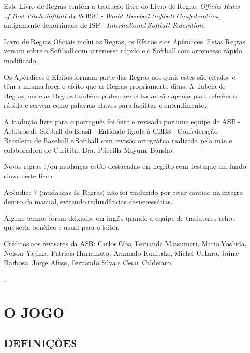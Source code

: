 \newpage
\vfill
\begin{center}
	\begin{minipage}{.80\textwidth}
		\setlength{\parskip}{3mm}
		 Este Livro de Regras contém a tradução livre do Livro de Regras \textit{Official Rules  of Fast Pitch Softball} da WBSC - \textit{World Baseball Softball Confederation},  antigamente denominada de ISF - \textit{International Softball Federation}.

		 Livro de Regras Oficiais inclui as Regras, os Efeitos e os Apêndices. Estas  Regras versam sobre o Softball com arremesso rápido e o Softball com arremesso rápido modificado.

		 Os Apêndices e Efeitos formam parte das Regras nos quais estes são citados  e têm a mesma força e efeito que as Regras propriamente ditas. A Tabela de Regras, onde as Regras também podem ser achadas são apenas para  referência rápida e servem como palavras chaves para facilitar o entendimento.

		 A tradução livre para o português foi feita e revisada por uma equipe da ASB - Árbitros de Softball do Brasil - Entidade ligada à CBBS - Confederação Brasileira  de Baseball e Softball com revisão ortográfica realizada pela mãe e colaboradora de Curitiba: Dra. Priscilla Mayumi Bansho.

		 Novas regras e/ou mudanças estão destacadas em negrito com destaque em fundo cinza neste livro.

		 Apêndice 7 (mudanças de Regras) não foi traduzido por estar contido na integra dentro do manual, evitando redundâncias desnecessárias.

		 Alguns termos foram deixados em inglês quando a equipe de tradutores achou que seria benéfico e usual para o leitor.

		 Créditos aos revisores da ASB: Carlos Oba, Fernando Matsumori, Mario Yoshida, Nelson Yajima, Patricia Hamamoto, Armando Kunitake, Michel Uehara, Jaime Barbosa, Jorge  Afuso, Fernando Silva e  Cesar  Calderaro.

 	\end{minipage}
\end{center}
\vfill.

\chapter{O JOGO}

\minitoc%

\section{DEFINIÇÕES}

